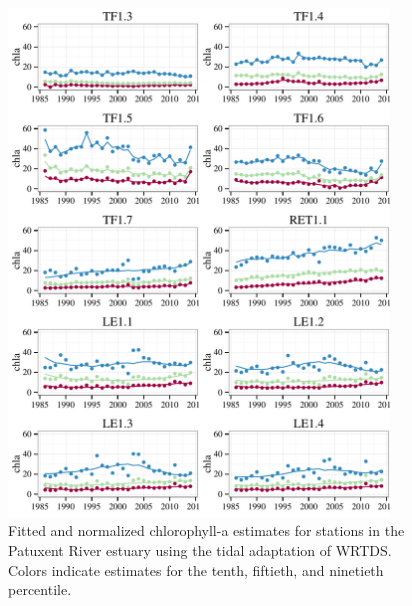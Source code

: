 \documentclass[letterpaper,12pt]{article}\usepackage[]{graphicx}\usepackage[]{color}
\begin{document}
\begin{figure}
\centering
\includegraphics[width = 0.9\textwidth]{figs/patux_prdnrms.pdf}
\caption{Fitted and normalized chlorophyll-a estimates for stations in the Patuxent River estuary using the tidal adaptation of WRTDS.  Colors indicate estimates for the tenth, fiftieth, and ninetieth percentile.}
\label{fig:patux_prdnrms}
\end{figure}
\end{document}
